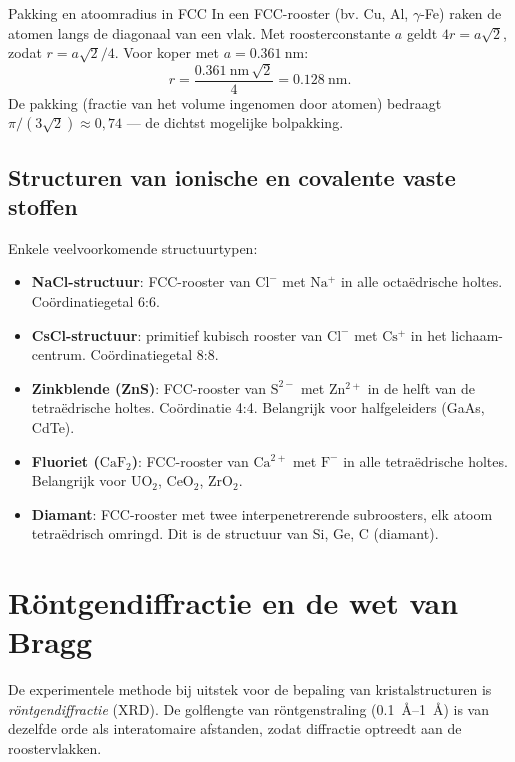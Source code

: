 \begin{voorbeeld}{Pakking en atoomradius in FCC}
In een FCC-rooster (bv. Cu, Al, $\gamma$-Fe) raken de atomen langs de diagonaal van een vlak. Met roosterconstante $a$ geldt $4r = a\sqrt{2}$, zodat $r = a\sqrt{2}/4$. Voor koper met $a = \SI{0.361}{\nano\metre}$:
\[
r = \frac{\SI{0.361}{\nano\metre}\,\sqrt{2}}{4} = \SI{0.128}{\nano\metre}.
\]
De pakking (fractie van het volume ingenomen door atomen) bedraagt $\pi/(3\sqrt{2}) \approx 0{,}74$ --- de dichtst mogelijke bolpakking.
\end{voorbeeld}

\subsection{Structuren van ionische en covalente vaste stoffen}

Enkele veelvoorkomende structuurtypen:

\begin{itemize}
\item \textbf{NaCl-structuur}: FCC-rooster van $\mathrm{Cl^-}$ met $\mathrm{Na^+}$ in alle octa\"edrische holtes. Co\"ordinatiegetal 6:6.
\item \textbf{CsCl-structuur}: primitief kubisch rooster van $\mathrm{Cl^-}$ met $\mathrm{Cs^+}$ in het lichaam-centrum. Co\"ordinatiegetal 8:8.
\item \textbf{Zinkblende (ZnS)}: FCC-rooster van $\mathrm{S^{2-}}$ met $\mathrm{Zn^{2+}}$ in de helft van de tetra\"edrische holtes. Co\"ordinatie 4:4. Belangrijk voor halfgeleiders (GaAs, CdTe).
\item \textbf{Fluoriet ($\mathrm{CaF_2}$)}: FCC-rooster van $\mathrm{Ca^{2+}}$ met $\mathrm{F^-}$ in alle tetra\"edrische holtes. Belangrijk voor $\mathrm{UO_2}$, $\mathrm{CeO_2}$, $\mathrm{ZrO_2}$.
\item \textbf{Diamant}: FCC-rooster met twee interpenetrerende subroosters, elk atoom tetra\"edrisch omringd. Dit is de structuur van Si, Ge, C (diamant).
\end{itemize}

\section{R\"ontgendiffractie en de wet van Bragg}
\label{sec:xrd}

De experimentele methode bij uitstek voor de bepaling van kristalstructuren is \emph{r\"ontgendiffractie} (XRD). De golflengte van r\"ontgenstraling (\SIrange{0.1}{1}{\angstrom}) is van dezelfde orde als interatomaire afstanden, zodat diffractie optreedt aan de roostervlakken.


